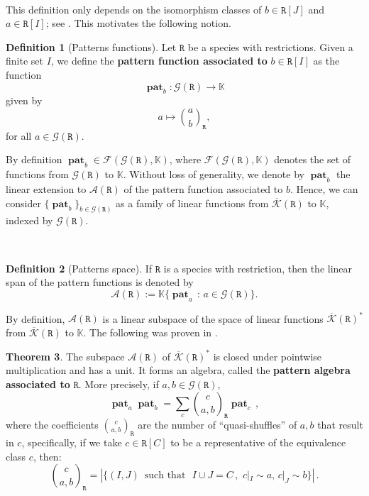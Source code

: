 \documentclass[12pt, reqno]{amsart}
\theoremstyle{definition}
\newtheorem{thm}{Theorem}[section]
\newtheorem{defin}[thm]{Definition}
\DeclareMathOperator{\pat}{\mathbf{pat}}
\newcommand{\prR}{\mathtt{R}}
\newcommand{\Kc}{\mathcal{K}}
\newcommand{\Kcb}{\overline{\Kc}}
\begin{document}
\

This definition only depends on the isomorphism classes of $b \in \prR[J]$ and $a \in \prR[I]$; see \cite{Penaguiao2020}. This motivates the following notion.

\begin{defin}[Patterns functions]\label{defin:pattern}
Let $\prR$ be a species with restrictions. Given a finite set $I$, we define the {\bf pattern function associated to} $b \in \prR[I]$ as the function
\[\pat_b: \mathcal{G}(\prR) \to \mathbb{K} \]
given by
\begin{equation}
    a \mapsto \binom{a}{b}_{\!\prR},
\end{equation}
for all $a \in \mathcal{G}(\prR)$.
\end{defin}

By definition $\pat_b \in \mathcal{F}(\mathcal{G}(\prR), \mathbb{K})$, where $\mathcal{F}(\mathcal{G}(\prR), \mathbb{K})$ denotes the set of functions from $\mathcal{G}(\prR)$ to $\mathbb{K}$. Without loss of generality, we denote by $\pat_b$ the linear extension to $\mathcal{A}(\mathtt{\prR})$ of the pattern function associated to $b$. Hence, we can consider $\{ \pat_b \}_{b\in \mathcal{G}(\prR)}$ as a family of linear functions from $\Kcb(\prR)$ to $\mathbb{K}$, indexed by $\mathcal{G}(\prR)$.

\

\begin{defin}[Patterns space]
If $\prR$ is a species with restriction, then the linear span of the pattern functions is denoted by
\begin{equation}
    \mathcal{A}(\prR):=\mathbb{K}\{\pat_a \, : \, a\in \mathcal{G}(\prR)\}.
\end{equation}
\end{defin}

By definition, $\mathcal{A}(\prR)$ is a linear subspace of the space of linear functions $\Kcb(\prR)^*$ from $\Kcb(\prR)$ to $\mathbb{K}$. The following was proven in \cite{Penaguiao2020}.

\begin{thm}
The subspace $\mathcal{A}(\prR)$ of $\Kcb(\prR)^*$ is closed under pointwise multiplication and has a unit.
It forms an algebra, called the {\bf pattern algebra associated to} $\prR$.
More precisely, if $a, b \in \mathcal G(\prR)$,
\begin{equation}\label{eq:prodrule}
\pat_ a   \pat_b = \sum_c \binom{c}{a, b}_{\! \prR} \pat_c \, ,
\end{equation}
where the coefficients $\binom{c}{a, b}_{\!\prR}$ are the number of ``quasi-shuffles'' of $a, b$ that result in $c$, specifically, if we take $c\in \prR[C]$ to be a representative of the equivalence class $c$, then:
$$ \binom{c}{a, b}_{\!\prR} = \left| \{(I, J) \, \text{ such that } \, \,  I \cup J = C \, ,\, \, c|_{I} \sim a, \, c|_{J} \sim b \} \right| \, .  $$
\end{thm} 
\end{document}

